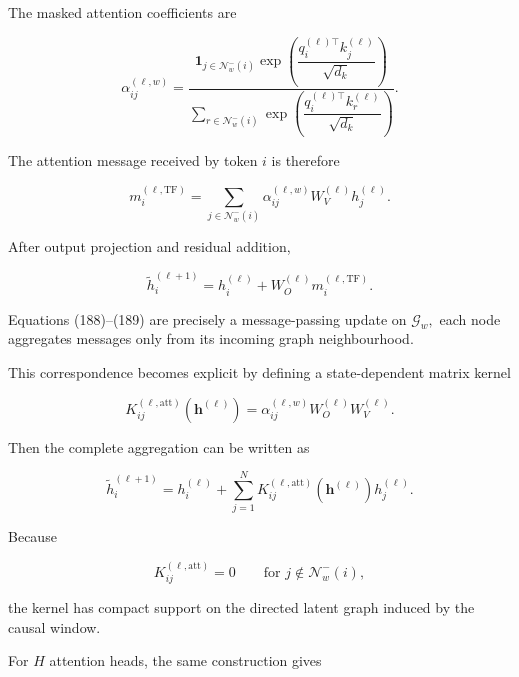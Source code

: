The masked attention coefficients are

\begin{equation}
\label{eq:187}
\alpha_{ij}^{(\ell,w)}=\frac{\mathbf1_{j\in\mathcal N_w^{-}(i)}\exp\left(\dfrac{q_i^{(\ell)\top}k_j^{(\ell)}}{\sqrt{d_k}}\right)}{\displaystyle\sum_{r\in\mathcal N_w^{-}(i)}\exp\left(\dfrac{q_i^{(\ell)\top}k_r^{(\ell)}}{\sqrt{d_k}}\right)}.
\end{equation}

The attention message received by token \(i\) is therefore

\begin{equation}
\label{eq:188}
m_i^{(\ell,\mathrm{TF})}=\sum_{j\in\mathcal N_w^{-}(i)}\alpha_{ij}^{(\ell,w)}W_V^{(\ell)}h_j^{(\ell)}.
\end{equation}

After output projection and residual addition,

\begin{equation}
\label{eq:189}
\widetilde h_i^{(\ell+1)}=h_i^{(\ell)}+W_O^{(\ell)}m_i^{(\ell,\mathrm{TF})}.
\end{equation}

Equations (188)–(189) are precisely a message-passing update on \(\mathcal{G}_{w} ,\) each node aggregates messages only from its incoming graph neighbourhood.

This correspondence becomes explicit by defining a state-dependent matrix kernel

\begin{equation}
\label{eq:190}
K_{ij}^{(\ell,\mathrm{att})}(\mathbf h^{(\ell)})=\alpha_{ij}^{(\ell,w)}W_O^{(\ell)}W_V^{(\ell)}.
\end{equation}

Then the complete aggregation can be written as

\begin{equation}
\label{eq:191}
\widetilde h_i^{(\ell+1)}=h_i^{(\ell)}+\sum_{j=1}^{N}K_{ij}^{(\ell,\mathrm{att})}(\mathbf h^{(\ell)})h_j^{(\ell)}.
\end{equation}

Because

\begin{equation}
\label{eq:192}
K_{ij}^{(\ell,\mathrm{att})}=0\qquad\text{for }j\notin\mathcal N_w^{-}(i),
\end{equation}

the kernel has compact support on the directed latent graph induced by the causal window.

For \(H\) attention heads, the same construction gives

